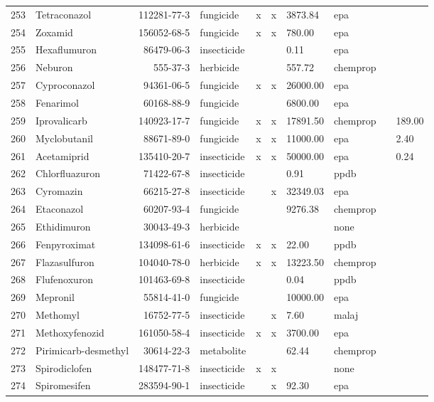 \begin{longtable}{lp{3cm}rlp{0.5cm}p{0.5cm}p{1.5cm}p{1cm}p{1cm}p{1cm}}
  253 & Tetraconazol & 112281-77-3 & fungicide & x & x & 3873.84 & epa &  &  \\ 
  254 & Zoxamid & 156052-68-5 & fungicide & x & x & 780.00 & epa &  &  \\ 
  255 & Hexaflumuron & 86479-06-3 & insecticide &  &  & 0.11 & epa &  &  \\ 
  256 & Neburon & 555-37-3 & herbicide &  &  & 557.72 & chemprop &  &  \\ 
  257 & Cyproconazol & 94361-06-5 & fungicide & x & x & 26000.00 & epa &  &  \\ 
  258 & Fenarimol & 60168-88-9 & fungicide &  &  & 6800.00 & epa &  &  \\ 
  259 & Iprovalicarb & 140923-17-7 & fungicide & x & x & 17891.50 & chemprop &  & 189.00 \\ 
  260 & Myclobutanil & 88671-89-0 & fungicide & x & x & 11000.00 & epa &  & 2.40 \\ 
  261 & Acetamiprid & 135410-20-7 & insecticide & x & x & 50000.00 & epa &  & 0.24 \\ 
  262 & Chlorfluazuron & 71422-67-8 & insecticide &  &  & 0.91 & ppdb &  &  \\ 
  263 & Cyromazin & 66215-27-8 & insecticide &  & x & 32349.03 & epa &  &  \\ 
  264 & Etaconazol & 60207-93-4 & fungicide &  &  & 9276.38 & chemprop &  &  \\ 
  265 & Ethidimuron & 30043-49-3 & herbicide &  &  &  & none &  &  \\ 
  266 & Fenpyroximat & 134098-61-6 & insecticide & x & x & 22.00 & ppdb &  &  \\ 
  267 & Flazasulfuron & 104040-78-0 & herbicide & x & x & 13223.50 & chemprop &  &  \\ 
  268 & Flufenoxuron & 101463-69-8 & insecticide &  &  & 0.04 & ppdb &  &  \\ 
  269 & Mepronil & 55814-41-0 & fungicide &  &  & 10000.00 & epa &  &  \\ 
  270 & Methomyl & 16752-77-5 & insecticide &  & x & 7.60 & malaj &  &  \\ 
  271 & Methoxyfenozid & 161050-58-4 & insecticide & x & x & 3700.00 & epa &  &  \\ 
  272 & Pirimicarb-desmethyl & 30614-22-3 & metabolite &  &  & 62.44 & chemprop &  &  \\ 
  273 & Spirodiclofen & 148477-71-8 & insecticide & x & x &  & none &  &  \\ 
  274 & Spiromesifen & 283594-90-1 & insecticide &  & x & 92.30 & epa &  &  \\ 

\end{longtable}
